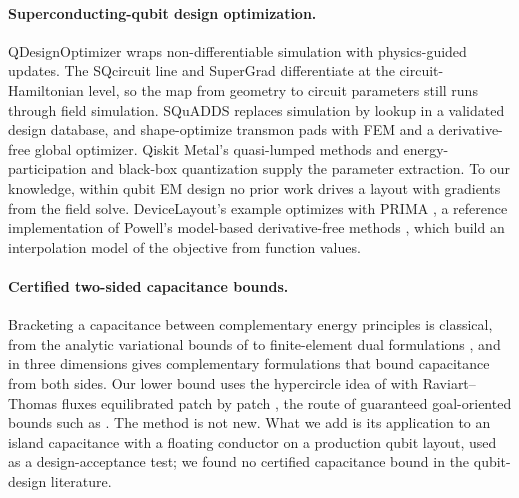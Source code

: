 \documentclass{anvil-paper}
\begin{document}
\paragraph{Superconducting-qubit design optimization.}
QDesignOptimizer \citep{eriksson2025automated} wraps
non-differentiable simulation with physics-guided updates. The SQcircuit
line \citep{rajabzadeh2023analysis,rajabzadeh2024general} and SuperGrad
\citep{wang2025supergrad} differentiate at the circuit-Hamiltonian level,
so the map from geometry to circuit parameters still runs through field
simulation. SQuADDS \citep{shanto2024squadds} replaces simulation by
lookup in a validated design database, and \citet{eun2023shape}
shape-optimize transmon pads with FEM and a derivative-free global
optimizer. Qiskit Metal's quasi-lumped methods \citep{minev2021circuit} and
energy-participation and black-box quantization
\citep{koch2007,nigg2012,minev2021} supply the parameter extraction. To our
knowledge, within qubit EM design no prior work drives a layout with
gradients from the field solve. DeviceLayout's example optimizes with
PRIMA \citep{zhang2023prima}, a reference implementation of Powell's
model-based derivative-free methods
\citep{powell1994direct,powell2006newuoa}, which build an interpolation
model of the objective from function values.

\paragraph{Certified two-sided capacitance bounds.}
Bracketing a capacitance between complementary energy principles is
classical, from the analytic variational bounds of
\citet{polya1951isoperimetric} to finite-element dual formulations
\citep{hammond1976calculation,penman1983dual}, and in three dimensions
\citet{specogna2011complementary} gives complementary formulations that
bound capacitance from both sides. Our lower bound uses the hypercircle
idea of \citet{prager1947approximations} with Raviart--Thomas fluxes
\citep{raviart1977mixed} equilibrated patch by patch
\citep{braess2007equilibrated,braess2009equilibrated,ern2015polynomial},
the route of guaranteed goal-oriented bounds such as
\citet{pares2021posteriori}. The method is not new. What we add is its
application to an island capacitance with a floating conductor on a
production qubit layout, used as a design-acceptance test; we found no
certified capacitance bound in the qubit-design literature.
\end{document}
